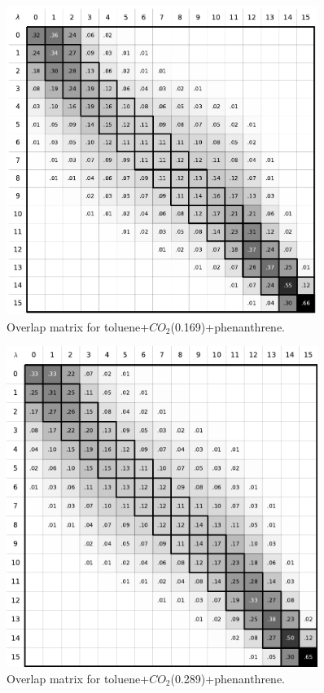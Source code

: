 \documentclass[
	12pt,				%
	openany,			%
	oneside,			%
	a4paper,			%
	english,			%
	brazil				%
	]{abntex2}
\begin{document}
\begin{apendicesenv}
\begin{figure}[H]
	\centering
	\includegraphics[width=0.9\textwidth]{Figures/otolco2_3}
	\caption{Overlap matrix for toluene+$CO_{2}$(0.169)+phenanthrene.}
\end{figure}

\begin{figure}[H]
	\centering
	\includegraphics[width=0.9\textwidth]{Figures/otolco2_4}
	\caption{Overlap matrix for toluene+$CO_{2}$(0.289)+phenanthrene.}
\end{figure}


\end{apendicesenv}
\end{document}
